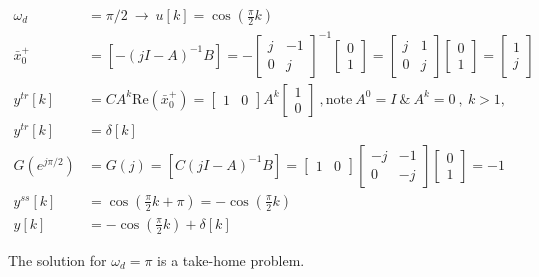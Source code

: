 \documentclass[twoside]{article}
\begin{document}
\begin{align*} 
    \omega_d &= \pi/2 \ \rightarrow \ u[k] = \cos \left( \frac{\pi}{2} k \right)
    \\[1ex]
    \bar{x}_0^+ &= \left[ - (j I - A)^{-1} B \right] = - \begin{bmatrix} j & -1 \\ 0 & j \end{bmatrix}^{-1} \begin{bmatrix} 0 \\ 1 \end{bmatrix} = 
     \begin{bmatrix} j & 1 \\ 0 & j \end{bmatrix} \begin{bmatrix} 0 \\ 1 \end{bmatrix} = \begin{bmatrix} 1 \\ j \end{bmatrix} 
     \\[1ex]
     y^{tr}[k] &= C A^k \mathrm{Re} \left( \bar{x}_0^+ \right) = \begin{bmatrix} 1 & 0 \end{bmatrix} A^k \begin{bmatrix} 1 \\ 0 \end{bmatrix} \ ,  \mathrm{note} \  A^0 = I \ \& \ A^k = 0 \ , \ k > 1 ,
     \\[1ex]
     y^{tr}[k] &= \delta[k]
     \\[1ex]
     G(e^{j \pi/2 }) &= G(j) = \left[ C (j I - A)^{-1} B \right] = \begin{bmatrix} 1 & 0 \end{bmatrix} \begin{bmatrix} -j & -1 \\ 0 & -j \end{bmatrix} \begin{bmatrix} 0 \\ 1 \end{bmatrix} = -1
     \\[1ex]
     y^{ss}[k] &= \cos\left( \frac{\pi}{2} k + \pi \right) = - \cos\left( \frac{\pi}{2} k \right)
     \\[1ex]
     y[k] &= - \cos\left( \frac{\pi}{2} k \right) + \delta[k]
\end{align*}

The solution for $\omega_d = \pi$ is a take-home problem. 
\end{document}
